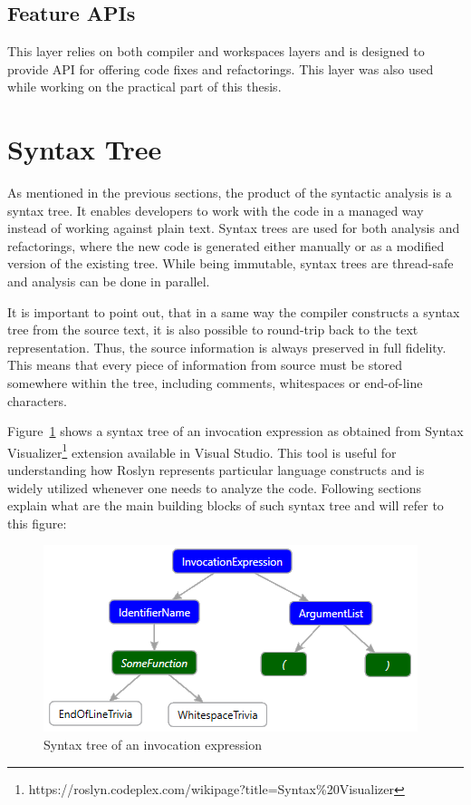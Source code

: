\documentclass[
  digital, %
  table,   %
  lof,     %
  lot,     %
  oneside,
]{fithesis3}
\begin{document}
\subsection{Feature APIs}
This layer relies on both compiler and workspaces layers and is designed to provide API for offering code fixes and refactorings. This layer was also used while working on the practical part of this thesis.
  
\section{Syntax Tree}
As mentioned in the previous sections, the product of the syntactic analysis is a syntax tree. It enables developers to work with the code in a managed way instead of working against plain text. Syntax trees are used for both analysis and refactorings, where the new code is generated either manually or as a modified version of the existing tree. While being immutable, syntax trees are thread-safe and analysis can be done in parallel.

It is important to point out, that in a same way the compiler constructs a syntax tree from the source text, it is also possible to round-trip back to the text representation. Thus, the source information is always preserved in full fidelity. This means that every piece of information from source must be stored somewhere within the tree, including comments, whitespaces or end-of-line characters. 

Figure~\ref{fig:roslyn-syntax-tree} shows a syntax tree of an invocation expression as obtained from Syntax Visualizer\footnote{https://roslyn.codeplex.com/wikipage?title=Syntax\%20Visualizer} extension available in Visual Studio. This tool is useful for understanding how Roslyn represents particular language constructs and is widely utilized whenever one needs to analyze the code. Following sections explain what are the main building blocks of such syntax tree and will refer to this figure:

\begin{figure}[h!]
		\centering
			\includegraphics[scale=0.8]{img/roslyn-syntax-tree-2}
		\caption{Syntax tree of an invocation expression}
		\label{fig:roslyn-syntax-tree}
\end{figure}
\end{document}
